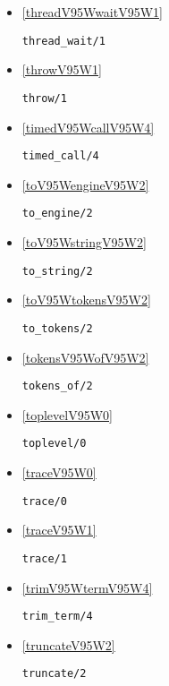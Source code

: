 \begin{itemize}
\item \ref{threadV95WwaitV95W1} 
\begin{verbatim}
thread_wait/1
\end{verbatim}

\item \ref{throwV95W1} 
\begin{verbatim}
throw/1
\end{verbatim}

\item \ref{timedV95WcallV95W4} 
\begin{verbatim}
timed_call/4
\end{verbatim}

\item \ref{toV95WengineV95W2} 
\begin{verbatim}
to_engine/2
\end{verbatim}

\item \ref{toV95WstringV95W2} 
\begin{verbatim}
to_string/2
\end{verbatim}

\item \ref{toV95WtokensV95W2} 
\begin{verbatim}
to_tokens/2
\end{verbatim}

\item \ref{tokensV95WofV95W2} 
\begin{verbatim}
tokens_of/2
\end{verbatim}

\item \ref{toplevelV95W0} 
\begin{verbatim}
toplevel/0
\end{verbatim}

\item \ref{traceV95W0} 
\begin{verbatim}
trace/0
\end{verbatim}

\item \ref{traceV95W1} 
\begin{verbatim}
trace/1
\end{verbatim}

\item \ref{trimV95WtermV95W4} 
\begin{verbatim}
trim_term/4
\end{verbatim}

\item \ref{truncateV95W2} 
\begin{verbatim}
truncate/2
\end{verbatim}


\end{itemize}
